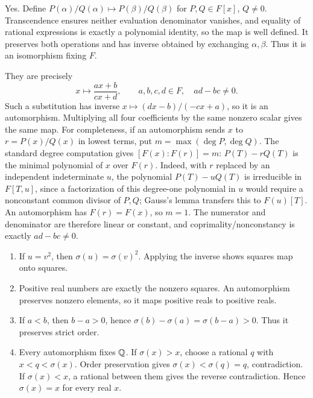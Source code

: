 Yes. Define $P(\alpha)/Q(\alpha)\mapsto P(\beta)/Q(\beta)$ for $P,Q\in F[x]$, $Q\ne0$. Transcendence ensures neither evaluation denominator vanishes, and equality of rational expressions is exactly a polynomial identity, so the map is well defined. It preserves both operations and has inverse obtained by exchanging $\alpha,\beta$. Thus it is an isomorphism fixing $F$.

They are precisely
\[x\longmapsto\frac{ax+b}{cx+d},\qquad a,b,c,d\in F,\quad ad-bc\ne0.\]
Such a substitution has inverse $x\mapsto (dx-b)/(-cx+a)$, so it is an automorphism. Multiplying all four coefficients by the same nonzero scalar gives the same map.
For completeness, if an automorphism sends $x$ to $r=P(x)/Q(x)$ in lowest terms, put $m=\max(\deg P,\deg Q)$. The standard degree computation gives $[F(x):F(r)]=m$: $P(T)-rQ(T)$ is the minimal polynomial of $x$ over $F(r)$. Indeed, with $r$ replaced by an independent indeterminate $u$, the polynomial $P(T)-uQ(T)$ is irreducible in $F[T,u]$, since a factorization of this degree-one polynomial in $u$ would require a nonconstant common divisor of $P,Q$; Gauss's lemma transfers this to $F(u)[T]$. An automorphism has $F(r)=F(x)$, so $m=1$. The numerator and denominator are therefore linear or constant, and coprimality/nonconstancy is exactly $ad-bc\ne0$.

\begin{enumerate}[label=(\alph*)]
\item If $u=v^2$, then $\sigma(u)=\sigma(v)^2$. Applying the inverse shows squares map onto squares.
\item Positive real numbers are exactly the nonzero squares. An automorphism preserves nonzero elements, so it maps positive reals to positive reals.
\item If $a<b$, then $b-a>0$, hence $\sigma(b)-\sigma(a)=\sigma(b-a)>0$. Thus it preserves strict order.
\item Every automorphism fixes $\mathbb{Q}$. If $\sigma(x)>x$, choose a rational $q$ with $x<q<\sigma(x)$. Order preservation gives $\sigma(x)<\sigma(q)=q$, contradiction. If $\sigma(x)<x$, a rational between them gives the reverse contradiction. Hence $\sigma(x)=x$ for every real $x$.
\end{enumerate}
